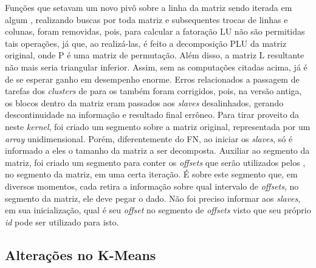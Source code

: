 \documentclass[a4paper,11pt]{article}
\begin{document}
Funções que setavam um novo pivô sobre a linha da matriz sendo iterada em algum \cc , realizando buscas por toda matriz e subsequentes trocas de linhas e colunas, foram removidas, pois, para calcular a fatoração LU não são permitidas tais operações, já que, ao realizá-las, é feito a decomposição PLU da matriz original, onde P é uma matriz de permutação. Além disso, a matriz L resultante não mais seria triangular inferior. Assim, sem as computações citadas acima, já é de se esperar ganho em desempenho enorme. Erros relacionados a passagem de tarefas dos \textit{clusters} de \io para os \ccs também foram corrigidos, pois, na versão antiga, os blocos dentro da matriz eram passados aos \textit{slaves} desalinhados, gerando descontinuidade na informação e resultado final errôneo. Para tirar proveito da \async neste \textit{kernel}, foi criado um segmento sobre a matriz original, representada por um \textit{array} unidimensional. Porém, diferentemente do FN, ao iniciar os \textit{slaves}, só é informado a eles o tamanho da matriz a ser decomposta. Auxiliar ao segmento da matriz, foi criado um segmento para conter os \textit{offsets} que serão utilizados pelos \ccs, no segmento da matriz, em uma certa iteração. É sobre este segmento que, em diversos momentos, cada \cc retira a informação sobre qual intervalo de \textit{offsets}, no segmento da matriz, ele deve pegar o dado. Não foi preciso informar aos \textit{slaves}, em sua inicialização, qual é seu \textit{offset} no segmento de \textit{offsets} visto que seu próprio \textit{id} pode ser utilizado para isto.

\subsection{Alterações no K-Means}
\end{document}
